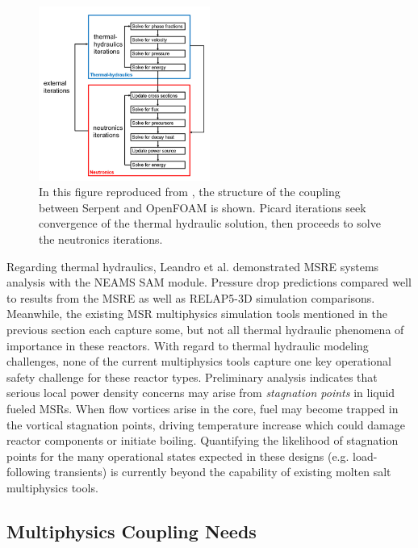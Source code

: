 \begin{figure}[htbp]
        \begin{center}
                \includegraphics[width=0.5\textwidth]{./cervi_solver.png}
        \end{center}
        \caption{In this figure reproduced from \cite{cervi_development_2019}, 
        the structure of the coupling between Serpent and OpenFOAM is shown. 
        Picard iterations seek convergence of the thermal hydraulic solution, 
        then proceeds to solve the neutronics iterations.}
        \label{fig:cervi}
\end{figure}

Regarding thermal hydraulics, Leandro et al. \cite{leandro_thermal_2019} 
demonstrated \gls{MSRE} systems analysis with the \gls{NEAMS} \gls{SAM} module. 
Pressure drop predictions compared well to results from 
the \gls{MSRE} as well as RELAP5-3D simulation comparisons. Meanwhile, the existing \gls{MSR} 
multiphysics simulation tools mentioned in the previous section each capture some, but 
not all thermal hydraulic phenomena of importance in these reactors. 
With regard to thermal hydraulic modeling challenges, none of the current multiphysics 
tools capture one key operational safety challenge for these reactor 
types. Preliminary analysis indicates that serious local power density concerns 
may arise from \emph{stagnation points} in liquid fueled \glspl{MSR}.  When 
flow vortices arise in the core, fuel may become trapped in the vortical 
stagnation points, driving temperature increase which could damage reactor 
components or initiate boiling.  Quantifying the likelihood of stagnation 
points for the many operational states expected in these designs (e.g.  
load-following transients) is currently beyond the capability of existing 
molten salt multiphysics tools.

\subsection{Multiphysics Coupling Needs}

